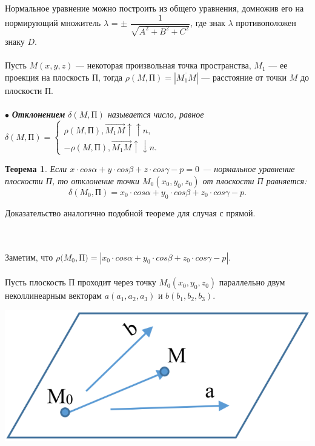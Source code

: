 Нормальное уравнение можно построить из общего уравнения, домножив его на нормирующий множитель
$\lambda$ = $\pm$ $\dfrac{1}{\sqrt{A^2 + B^2 + C^2}}$, где знак $\lambda$ противоположен знаку $D$.\\\\
Пусть $M(x, y, z)$ --- некоторая произвольная точка пространства, $M_1$ --- ее проекция на плоскость П,  тогда $\rho(M, \text{П}) = | \overline{M_1 M} |$ --- расстояние от точки $M$ до плоскости П. \\\\
$\bullet$ \textit{\textbf{Отклонением} $\delta(M, \text{П})$ называется число, равное}
$\delta(M, \text{П}) = \begin{cases} \rho(M, \text{П}), \overrightarrow{M_1 M} \uparrow\uparrow n, \\ -\rho(M, \text{П}), \overrightarrow{M_1 M} \uparrow\downarrow n. \end{cases}$
\newtheorem*{t5_1_3}{Теорема} \begin{t5_1_3} Если $x\cdot cos\alpha + y\cdot cos\beta + z\cdot cos\gamma - p = 0$ --- нормальное уравнение плоскости П, то отклонение точки $M_0(x_0, y_0, z_0)$ от плоскости П равняется:$$\delta(M_0, \text{П}) = x_0 \cdot cos \alpha  +  y_0 \cdot cos \beta  +  z_0 \cdot cos \gamma  -  p.$$\end{t5_1_3}\begin{Proof}
	Доказательство аналогично подобной теореме для случая с прямой.
\end{Proof}\\\\
Заметим, что $\rho(M_0, $П$) = |x_0\cdot cos\alpha + y_0 \cdot cos\beta + z_0\cdot cos\gamma - p|$.\\\\
Пусть плоскость П проходит через точку $M_0(x_0, y_0, z_0)$ параллельно двум неколлинеарным векторам $a(a_1, a_2, a_3)$ и $b(b_1, b_2, b_3)$. \begin{center}
	\includegraphics[scale=0.35]{images/pl3_4_1.png}
\end{center}

